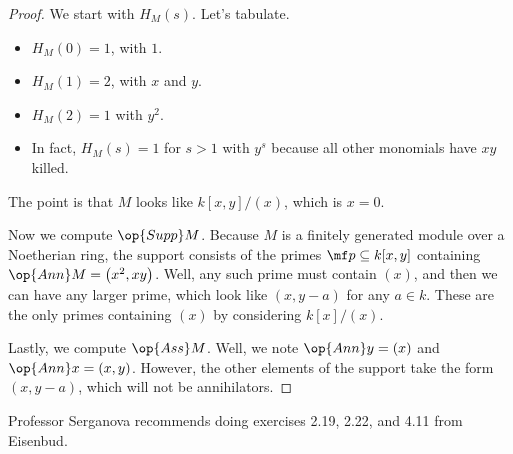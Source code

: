 \begin{proof}
	We start with $H_M(s)$. Let's tabulate.
	\begin{itemize}
		\item $H_M(0)=1$, with $1$.
		\item $H_M(1)=2$, with $x$ and $y$.
		\item $H_M(2)=1$ with $y^2$.
		\item In fact, $H_M(s)=1$ for $s>1$ with $y^s$ because all other monomials have $xy$ killed.
	\end{itemize}
	The point is that $M$ looks like $k[x,y]/(x)$, which is $x=0$.

	Now we compute $\op{Supp}M$. Because $M$ is a finitely generated module over a Noetherian ring, the support consists of the primes $\mf p\subseteq k[x,y]$ containing $\op{Ann}M=\left(x^2,xy\right)$. Well, any such prime must contain $(x)$, and then we can have any larger prime, which look like $(x,y-a)$ for any $a\in k$. These are the only primes containing $(x)$ by considering $k[x]/(x)$.

	Lastly, we compute $\op{Ass}M$. Well, we note $\op{Ann}y=(x)$ and $\op{Ann}x=(x,y)$. However, the other elements of the support take the form $(x,y-a)$, which will not be annihilators.
\end{proof}
\begin{remark}
	Professor Serganova recommends doing exercises 2.19, 2.22, and 4.11 from Eisenbud.
\end{remark}